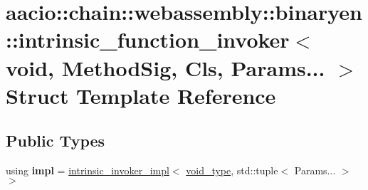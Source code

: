 \hypertarget{structaacio_1_1chain_1_1webassembly_1_1binaryen_1_1intrinsic__function__invoker_3_01void_00_01_mfe4bc7950479e99a3f3cb30dae7904e2}{}\section{aacio\+:\+:chain\+:\+:webassembly\+:\+:binaryen\+:\+:intrinsic\+\_\+function\+\_\+invoker$<$ void, Method\+Sig, Cls, Params... $>$ Struct Template Reference}
\label{structaacio_1_1chain_1_1webassembly_1_1binaryen_1_1intrinsic__function__invoker_3_01void_00_01_mfe4bc7950479e99a3f3cb30dae7904e2}
\subsection*{Public Types}
\begin{DoxyCompactItemize}
\item 
\mbox{\label{structaacio_1_1chain_1_1webassembly_1_1binaryen_1_1intrinsic__function__invoker_3_01void_00_01_mfe4bc7950479e99a3f3cb30dae7904e2_ab82baa89eac5d9f795d3d9e22383a036}} 
using {\bfseries impl} = \mbox{\hyperlink{structaacio_1_1chain_1_1webassembly_1_1binaryen_1_1intrinsic__invoker__impl}{intrinsic\+\_\+invoker\+\_\+impl}}$<$ \mbox{\hyperlink{structaacio_1_1chain_1_1webassembly_1_1binaryen_1_1void__type}{void\+\_\+type}}, std\+::tuple$<$ Params... $>$ $>$
\end{DoxyCompactItemize}
